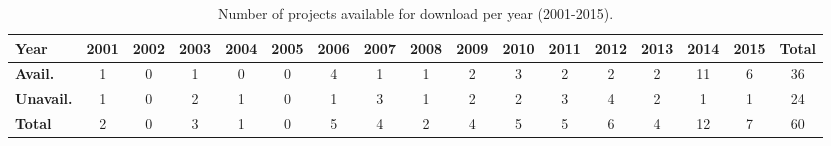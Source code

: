 \begin{table*}[htb]
\caption{Number of projects available for download per year (2001-2015).}
\centering
\begin{tabular}{l c c c c c c c c c c c c c c c|c}
\hline
  {\bf Year} & 2001 & 2002 & 2003 & 2004 & 2005 & 2006 & 2007 & 2008 & 2009 & 2010 & 2011 & 2012 & 2013 & 2014 & 2015 & {\bf Total} \\
  \hline
  {\bf Avail.} & 1 & 0 & 1 & 0 & 0 & 4 & 1 & 1 & 2 & 3 & 2 & 2 & 2 & 11 & 6 & 36 \\
  \hline
  {\bf Unavail.} & 1 & 0 & 2 & 1 & 0 & 1 & 3 & 1 & 2 & 2 & 3 & 4 & 2 & 1 & 1 & 24 \\
  \hline
  {\bf Total} & 2 & 0 & 3 & 1 & 0 & 5 & 4 & 2 & 4 & 5 & 5 & 6 & 4 & 12 & 7 & 60 \\
  \hline
\end{tabular}
\label{available-table}
\end{table*}
